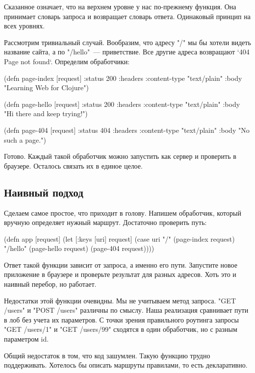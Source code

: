 Сказанное означает, что на верхнем уровне у нас по-прежнему функция. Она
принимает словарь запроса и возвращает словарь ответа. Одинаковый принцип на
всех уровнях.

Рассмотрим тривиальный случай. Вообразим, что адресу "/" мы бы хотели видеть
название сайта, а по "/hello"~--- приветствие. Все другие адреса возвращают `404
Page not found`. Определим обработчики:

\begin{code}
(defn page-index
  [request]
  {:status 200
   :headers {:content-type "text/plain"}
   :body "Learning Web for Clojure"})

(defn page-hello
  [request]
  {:status 200
   :headers {:content-type "text/plain"}
   :body "Hi there and keep trying!"})

(defn page-404
  [request]
  {:status 404
   :headers {:content-type "text/plain"}
   :body "No such a page."})
\end{code}

Готово. Каждый такой обработчик можно запустить как сервер и проверить в
браузере. Осталось связать их в единое целое.

\subsection{Наивный подход}

Сделаем самое простое, что приходит в голову. Напишем обработчик, который
вручную определяет нужный маршрут. Достаточно проверить путь:

\begin{code}
(defn app
  [request]
  (let [{:keys [uri]} request]
    (case uri
      "/"      (page-index request)
      "/hello" (page-hello request)
      (page-404 request))))
\end{code}

Ответ такой функции зависит от запроса, а именно его пути. Запустите новое
приложение в браузере и проверьте результат для разных адресов. Хоть это и
наивный перебор, но работает.

Недостатки этой функции очевидны. Мы не учитываем метод запроса. "GET /users" и
"POST /users" различны по смыслу. Наша реализация сравнивает пути в лоб без
учета их параметров. С точки зрения правильного роутинга запросы "GET /users/1"
и "GET /users/99" сходятся в один обработчик, но с разным параметром id.

Общий недостаток в том, что код зашумлен. Такую функцию трудно
поддерживать. Хотелось бы описать маршруты правилами, то есть декларативно.

